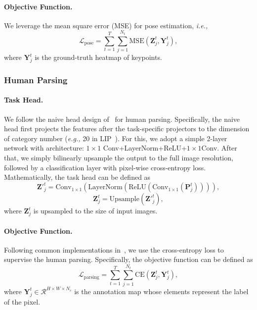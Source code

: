 \documentclass[10pt,twocolumn,letterpaper]{article}
\begin{document}
\paragraph{Objective Function.} We leverage the mean square error (MSE) for pose estimation, \emph{i.e.,}
\begin{equation}
    \mathcal{L}_{\text{pose}} = \sum_{t=1}^T\sum_{j=1}^{N_t} \text{MSE}(\mathbf{Z}^t_j, \mathbf{Y}^t_j),
\end{equation}
where $\mathbf{Y}^t_j$ is the ground-truth heatmap of keypoints.


\subsubsection{Human Parsing}
\paragraph{Task Head.} We follow the naive head design of~\cite{zheng2021rethinking} for human parsing. Specifically, the naive head first projects the features after the task-specific projectors to the dimension of category number (\emph{e.g.,} 20 in LIP~\cite{liang2018look}). For this, we adopt a simple 2-layer network with architecture: $1\times1$ Conv+LayerNorm+ReLU+$1\times1$Conv. After that, we simply bilinearly upsample the output to the full image resolution, followed by a classification layer with pixel-wise cross-entropy loss. Mathematically, the task head can be defined as
\begin{equation}
    \mathbf{Z}'^t_j = \text{Conv}_{1\times1}(\text{LayerNorm}(\text{ReLU}(\text{Conv}_{1\times1}(\mathbf{P}^t_j)))),
\end{equation}
\begin{equation}
    \mathbf{Z}^t_j = \text{Upsample}(\mathbf{Z}'^t_j),
\end{equation}
where $\mathbf{Z}^t_j$ is upsampled to the size of input images. 


\paragraph{Objective Function.} Following common implementations in~\cite{yuan2110hrformer}, we use the cross-entropy loss to supervise the human parsing. Specifically, the objective function can be defined as
\begin{equation}
    \mathcal{L}_{\text{parsing}} = \sum_{t=1}^T\sum_{j=1}^{N_t} \text{CE}(\mathbf{\mathbf{Z}}^t_j, \mathbf{Y}^t_j),
\end{equation}
where $\mathbf{Y}^t_j \in \mathcal{R}^{H \times W \times N_c}$ is the annotation map whose elements represent the label of the pixel.
\end{document}

